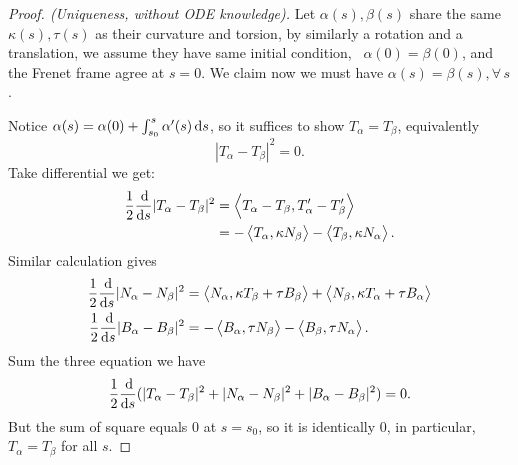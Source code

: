 \begin{proof}[Proof. (Uniqueness, without ODE knowledge)]\hfill

    Let \(\alpha(s),\beta(s)\) share the same \(\kappa(s),\tau(s)\) as their
    curvature and torsion, by similarly a rotation and a translation, we assume they
    have same initial condition, \ie\ \(\alpha(0)=\beta(0)\), and the Frenet frame
    agree at \(s=0\). We claim now we must have \(\alpha(s)=\beta(s),\forall\,s\).
    
    Notice \(\alpha(s)=\alpha(0)+\int_{s_0}^{s}\alpha'(s)\dif s\), so it
    suffices to show \(T_\alpha=T_\beta\), equivalently \[
        |T_\alpha-T_\beta|^2=0.
    \] Take differential we get:
    \begin{align*}
        \frac{1}{2}\frac{\dif}{\dif s}|T_\alpha-T_\beta|^2
        &= \left<T_\alpha-T_\beta,T_\alpha'-T_\beta'\right> \\
        &= -\left<T_\alpha,\kappa N_\beta\right> -\left<T_\beta,\kappa
        N_\alpha\right>
    .\end{align*}
    Similar calculation gives
    \begin{align*}
        \frac{1}{2}\frac{\dif}{\dif s}|N_\alpha-N_\beta|^2
        &= \left<N_\alpha,\kappa T_\beta+\tau B_\beta\right>
        +\left<N_\beta,\kappa T_\alpha+\tau B_\alpha\right> \\
        \frac{1}{2}\frac{\dif}{\dif s}|B_\alpha-B_\beta|^2
        &= -\left<B_\alpha,\tau N_\beta\right> -\left<B_\beta,\tau N_\alpha\right> 
    .\end{align*}
    Sum the three equation we have \[
        \frac{1}{2}\frac{\dif}{\dif s}(|T_\alpha-T_\beta|^2+|N_\alpha-N_\beta|^2
        +|B_\alpha-B_\beta|^2)=0
    .\] But the sum of square equals 0 at \(s=s_0\), so it is identically 0,
    in particular, \(T_\alpha=T_\beta\) for all \(s\).
\end{proof}
